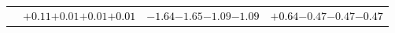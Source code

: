 \documentclass[compress]{beamer}
\begin{document}
\begin{frame}
\begin{tabular}{r | c | c | c}
          & \textcolor{black}{$+0.11$}\hspace{0.1 cm}$+0.01$\hspace{0.1 cm}$+0.01$\hspace{0.1 cm}\textcolor{black}{$+0.01$} & \textcolor{black}{$-1.64$}\hspace{0.1 cm}$-1.65$\hspace{0.1 cm}$-1.09$\hspace{0.1 cm}\textcolor{black}{$-1.09$} & \textcolor{black}{$+0.64$}\hspace{0.1 cm}$-0.47$\hspace{0.1 cm}$-0.47$\hspace{0.1 cm}\textcolor{black}{$-0.47$} \\
\end{tabular}
\end{frame}
\end{document}
